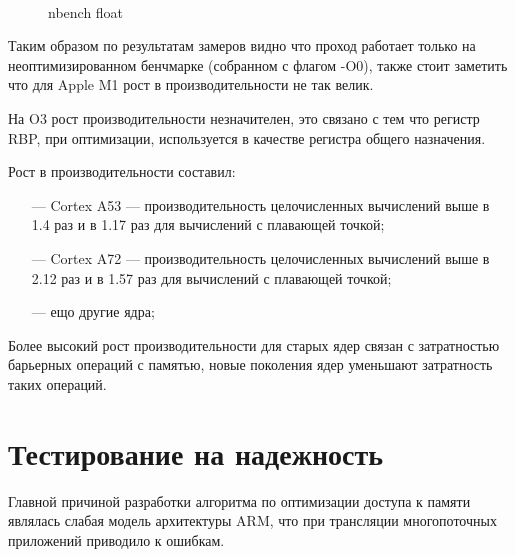 \begin{figure}[hbtp]
	\centering
	\\
	\caption{nbench float}
	\label{fig:speed}
\end{figure}

\newpage

Таким образом по результатам замеров видно что проход работает только на неоптимизированном бенчмарке (собранном с флагом -O0), также стоит заметить что для Apple M1 рост в производительности не так велик.

На O3 рост производительности незначителен, это связано с тем что регистр RBP, при оптимизации, используется в качестве регистра общего назначения.

Рост в производительности составил:
\begin{itemize}[leftmargin=1.6\parindent]
	\item[---] Cortex A53 --- производительность целочисленных вычислений выше в 1.4 раз и в 1.17 раз для вычислений с плавающей точкой;
	\item[---] Cortex A72 --- производительность целочисленных вычислений выше в 2.12 раз и в 1.57 раз для вычислений с плавающей точкой;
	\item[---] ещо другие ядра;
\end{itemize}

Более высокий рост производительности для старых ядер связан с затратностью барьерных операций с памятью, новые поколения ядер уменьшают затратность таких операций.

\section{Тестирование на надежность}

Главной причиной разработки алгоритма по оптимизации доступа к памяти являлась слабая модель архитектуры ARM, что при трансляции многопоточных приложений приводило к ошибкам.

